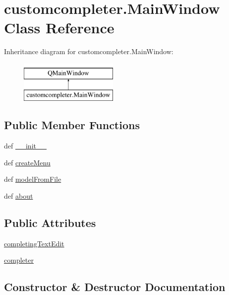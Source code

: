 \hypertarget{classcustomcompleter_1_1MainWindow}{}\section{customcompleter.\+Main\+Window Class Reference}
\label{classcustomcompleter_1_1MainWindow}
Inheritance diagram for customcompleter.\+Main\+Window\+:\begin{figure}[H]
\begin{center}
\leavevmode
\includegraphics[height=2.000000cm]{classcustomcompleter_1_1MainWindow}
\end{center}
\end{figure}
\subsection*{Public Member Functions}
\begin{DoxyCompactItemize}
\item 
def \hyperlink{classcustomcompleter_1_1MainWindow_a1efdf8955853e5e066a678362456cc5a}{\+\_\+\+\_\+init\+\_\+\+\_\+}
\item 
def \hyperlink{classcustomcompleter_1_1MainWindow_aa6569bd286f24af1b96e40b01d067720}{create\+Menu}
\item 
def \hyperlink{classcustomcompleter_1_1MainWindow_aad7dc0680ea2a8f4e0fe0fca310af3dc}{model\+From\+File}
\item 
def \hyperlink{classcustomcompleter_1_1MainWindow_a378e8cfe11d904593d1c38833a685f95}{about}
\end{DoxyCompactItemize}
\subsection*{Public Attributes}
\begin{DoxyCompactItemize}
\item 
\hyperlink{classcustomcompleter_1_1MainWindow_a6bf550411400fc2a9991f7dd14235e28}{completing\+Text\+Edit}
\item 
\hyperlink{classcustomcompleter_1_1MainWindow_a323afb13f1a7119b807915093745d421}{completer}
\end{DoxyCompactItemize}


\subsection{Constructor \& Destructor Documentation}
\hypertarget{classcustomcompleter_1_1MainWindow_a1efdf8955853e5e066a678362456cc5a}{}

